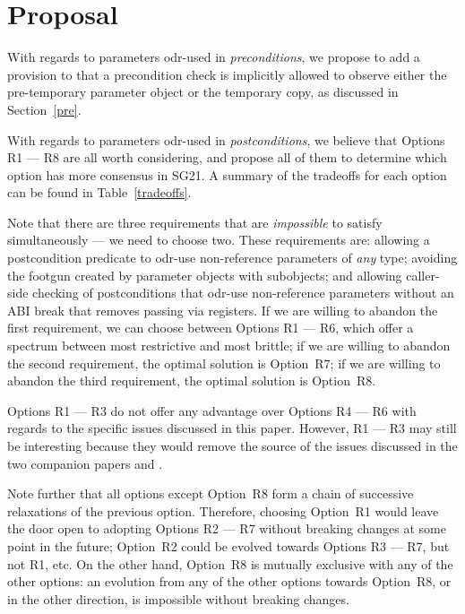 \pagebreak

\section{Proposal}

With regards to parameters odr-used in \emph{preconditions}, we propose to add a provision to \cite{P2900R10} that a precondition check is implicitly allowed to observe either the pre-temporary parameter object or the temporary copy, as discussed in Section~\ref{pre}.

With regards to parameters odr-used in \emph{postconditions}, we believe that Options R1 --- R8 are all worth considering, and propose all of them to determine which option has more consensus in SG21. A summary of the tradeoffs for each option can be found in Table~\ref{tradeoffs}.

Note that there are three requirements that are \emph{impossible} to satisfy simultaneously --- we need to choose two. These requirements are: allowing a postcondition predicate to odr-use non-reference parameters of \emph{any} type; avoiding the footgun created by parameter objects with  subobjects; and allowing caller-side checking of postconditions that odr-use non-reference parameters without an ABI break that removes passing via registers. If we are willing to abandon the first requirement, we can choose between Options R1 --- R6, which offer a spectrum between most restrictive and most brittle; if we are willing to abandon the second requirement, the optimal solution is Option~R7; if we are willing to abandon the third requirement, the optimal solution is Option~R8.

Options R1 --- R3 do not offer any advantage over Options R4 --- R6 with regards to the specific issues discussed in this paper. However, R1 --- R3 may still be interesting because they would remove the source of the issues discussed in the two companion papers \cite{D3484R1} and \cite{D3489R0}. 

Note further that all options except Option~R8 form a chain of successive relaxations of the previous option. Therefore, choosing Option~R1 would leave the door open to adopting Options R2 --- R7 without breaking changes at some point in the future; Option~R2 could be evolved towards Options R3 --- R7, but not R1, etc. On the other hand, Option~R8 is mutually exclusive with any of the other options: an evolution from any of the other options towards Option~R8, or in the other direction, is impossible without breaking changes.

